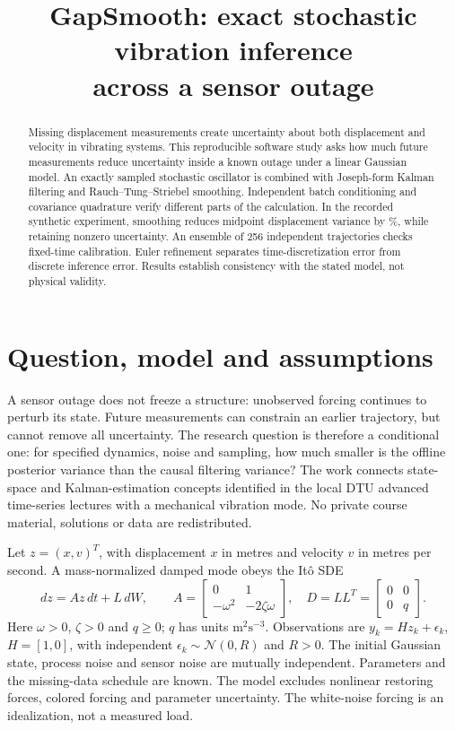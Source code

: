 \documentclass[10pt,a4paper]{article}
\title{GapSmooth: exact stochastic vibration inference\\across a sensor outage}
\author{}
\date{}
\begin{document}
\maketitle
\vspace{-1.6em}
\begin{abstract}
Missing displacement measurements create uncertainty about both displacement
and velocity in vibrating systems. This reproducible software study asks how
much future measurements reduce uncertainty inside a known outage under a
linear Gaussian model. An exactly sampled stochastic oscillator is combined
with Joseph-form Kalman filtering and Rauch--Tung--Striebel smoothing. Independent
batch conditioning and covariance quadrature verify different parts of the
calculation. In the recorded synthetic experiment, smoothing reduces midpoint
displacement variance by \Reduction\%, while retaining nonzero uncertainty.
An ensemble of 256 independent trajectories checks fixed-time calibration.
Euler refinement separates time-discretization error from discrete inference
error. Results establish consistency with the stated model, not physical validity.
\end{abstract}

\section{Question, model and assumptions}
A sensor outage does not freeze a structure: unobserved forcing continues to
perturb its state. Future measurements can constrain an earlier trajectory,
but cannot remove all uncertainty. The research question is therefore a
conditional one: for specified dynamics, noise and sampling, how much smaller
is the offline posterior variance than the causal filtering variance?
The work connects state-space and Kalman-estimation concepts identified in the
local DTU advanced time-series lectures with a mechanical vibration mode.
No private course material, solutions or data are redistributed.

Let $z=(x,v)^T$, with displacement $x$ in metres and velocity $v$ in metres per
second. A mass-normalized damped mode obeys the It\^o SDE
\begin{equation}
 dz=A z\,dt+L\,dW,\qquad
 A=\begin{bmatrix}0&1\\-\omega^2&-2\zeta\omega\end{bmatrix},\quad
 D=LL^T=\begin{bmatrix}0&0\\0&q\end{bmatrix}.
 \label{eq:model}
\end{equation}
Here $\omega>0$, $\zeta>0$ and $q\geq0$; $q$ has units
$\mathrm{m}^2\mathrm{s}^{-3}$. Observations are $y_k=Hz_k+\epsilon_k$,
$H=[1,0]$, with independent $\epsilon_k\sim\mathcal N(0,R)$ and $R>0$.
The initial Gaussian state, process noise and sensor noise are mutually
independent. Parameters and the missing-data schedule are known. The model
excludes nonlinear restoring forces, colored forcing and parameter uncertainty.
The white-noise forcing is an idealization, not a measured load.
\end{document}

